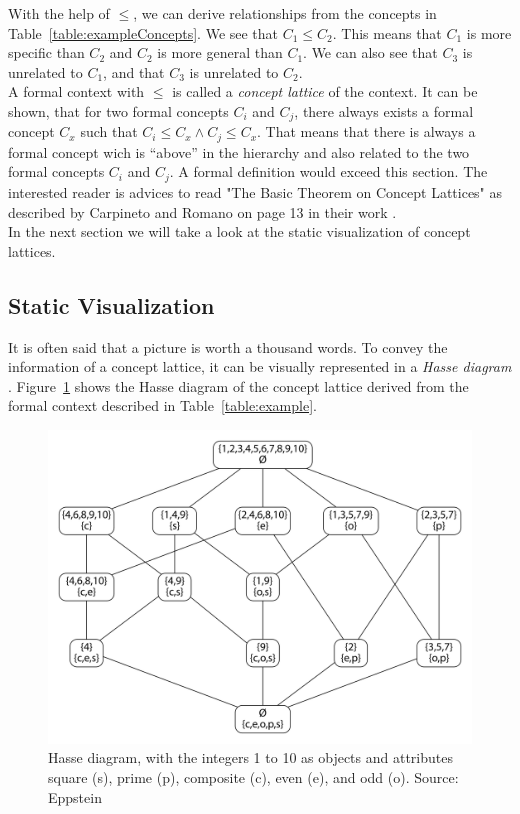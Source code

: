 \documentclass[11pt]{report}
\begin{document}
With the help of $\le$, we  can derive relationships from the concepts in Table~\ref{table:exampleConcepts}. We see that $C_1 \le C_2$. This means that $C_1$ is more specific than $C_2$ and $C_2$ is more general than $C_1$. We can also see that $C_3$ is unrelated to $C_1$, and that $C_3$ is unrelated to $C_2$. \\

A formal context with $\le$ is called a \textit{concept lattice} of the context. It can be shown, that for two formal concepts $C_i$ and $C_j$, there always exists a formal concept $C_x$ such that $C_i \le C_x \wedge C_j \le C_x$. That means that there is always a formal concept wich is ``above'' in the hierarchy and also related to the two formal concepts $C_i$ and $C_j$. A formal definition would exceed this section. The interested reader is advices to read "The Basic Theorem on Concept Lattices" as described by Carpineto and Romano on page 13 in their work \cite{carpineto2004concept}.\\

In the next section we will take a look at the static visualization of concept lattices.

\subsection{Static Visualization}

It is often said that a picture is worth a thousand words. To convey the information of a concept lattice, it can be visually represented in a \textit{Hasse diagram} \cite{Ganter2012}. Figure~\ref{figure:example} shows the Hasse diagram of the concept lattice derived from the formal context described in Table~\ref{table:example}. \\

\begin{figure}[!ht]
	\centering
	\includegraphics[width=\linewidth]{./images/fcaExample}
\caption{Hasse diagram, with the integers 1 to 10 as objects and attributes square (s), prime (p), composite (c), even (e), and odd (o). Source: Eppstein \cite{fcaexample}}
\label{figure:example}
\end{figure}
\end{document}
